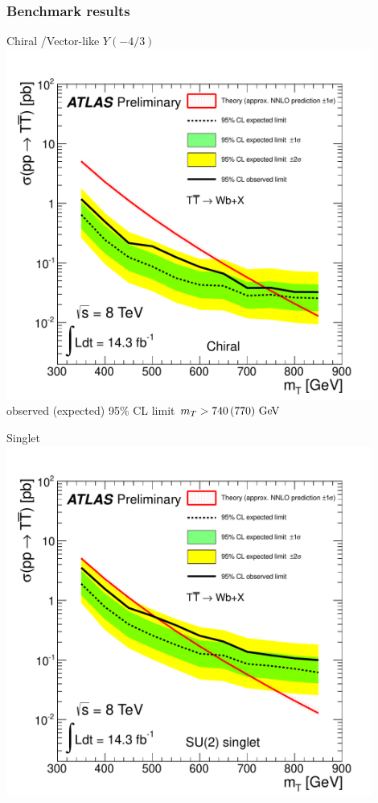 \begin{frame}\frametitle{Benchmark results}
\centering\footnotesize

\begin{minipage}{.5\textwidth}\centering

Chiral \T/Vector-like $Y(-4/3)$\\

\includegraphics[width=0.9\textwidth]{pics/lim_chiral_bin1_WbX}\\

observed (expected) 95\%  CL limit $m_{\T}>740\,(770)\gev$

\end{minipage}\begin{minipage}{.5\textwidth}\centering

Singlet \T\\

\includegraphics[width=0.9\textwidth]{pics/lim_singlet_bin1_WbX}\\


\end{minipage}
\end{frame}
